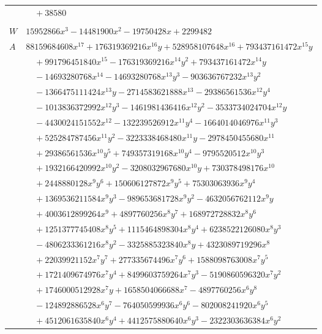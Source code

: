 \documentclass[11pt]{article}
\begin{document}
\begin{longtable}{@{}ll@{}}
 & $\quad +38580$\\
\addlinespace[3pt]
\multicolumn{2}{@{}l}{$i=7$, $m=52488$, neighbours $113,15,20,36,44,54,59,71,75,78,93,106$}\\
$W$ & $15952866x^{3}-14481900x^{2}-19750428x+2299482$\\
$A$ & $88159684608x^{17}+176319369216x^{16}y+528958107648x^{16}+793437161472x^{15}y$\\
 & $\quad +991796451840x^{15}-176319369216x^{14}y^{2}+793437161472x^{14}y$\\
 & $\quad -14693280768x^{14}-14693280768x^{13}y^{3}-903636767232x^{13}y^{2}$\\
 & $\quad -1366475111424x^{13}y-2714583621888x^{13}-29386561536x^{12}y^{4}$\\
 & $\quad -1013836372992x^{12}y^{3}-1461981436416x^{12}y^{2}-3533734024704x^{12}y$\\
 & $\quad -4430024151552x^{12}-132239526912x^{11}y^{4}-1664014046976x^{11}y^{3}$\\
 & $\quad +525284787456x^{11}y^{2}-3223338468480x^{11}y-2978450455680x^{11}$\\
 & $\quad +29386561536x^{10}y^{5}+749357319168x^{10}y^{4}-9795520512x^{10}y^{3}$\\
 & $\quad +1932166420992x^{10}y^{2}-3208032967680x^{10}y+730378498176x^{10}$\\
 & $\quad +2448880128x^{9}y^{6}+150606127872x^{9}y^{5}+75303063936x^{9}y^{4}$\\
 & $\quad +1369536211584x^{9}y^{3}-989653681728x^{9}y^{2}-4632056762112x^{9}y$\\
 & $\quad +4003612899264x^{9}+4897760256x^{8}y^{7}+168972728832x^{8}y^{6}$\\
 & $\quad +1251377745408x^{8}y^{5}+1115464898304x^{8}y^{4}+6238522126080x^{8}y^{3}$\\
 & $\quad -4806233361216x^{8}y^{2}-3325885323840x^{8}y+4323089719296x^{8}$\\
 & $\quad +22039921152x^{7}y^{7}+277335674496x^{7}y^{6}+1588098763008x^{7}y^{5}$\\
 & $\quad +1721409674976x^{7}y^{4}+8499603759264x^{7}y^{3}-5190860596320x^{7}y^{2}$\\
 & $\quad +1746000512928x^{7}y+1658504066688x^{7}-4897760256x^{6}y^{8}$\\
 & $\quad -124892886528x^{6}y^{7}-764050599936x^{6}y^{6}-802008241920x^{6}y^{5}$\\
 & $\quad +4512061635840x^{6}y^{4}+4412575880640x^{6}y^{3}-2322303636384x^{6}y^{2}$\\

\end{longtable}
\end{document}
